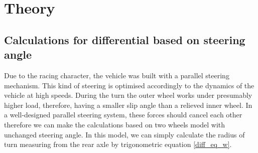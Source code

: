 




\chapter{Theory}

\section{Calculations for differential based on steering angle} \label{diff_calc}

Due to the racing character, the vehicle was built with a parallel steering mechanism. This kind of steering is optimised accordingly to the dynamics of the vehicle at high speeds. During the turn the outer wheel works under presumably higher load, therefore, having a smaller slip angle than a relieved inner wheel. In a well-designed parallel steering system, these forces should cancel each other therefore we can make the calculations based on two wheels model with unchanged steering angle.\cite{vehicle_dyna}
In this model, we can simply calculate the radius of turn measuring from the rear axle by trigonometric equation \ref{diff_eq_w}.

